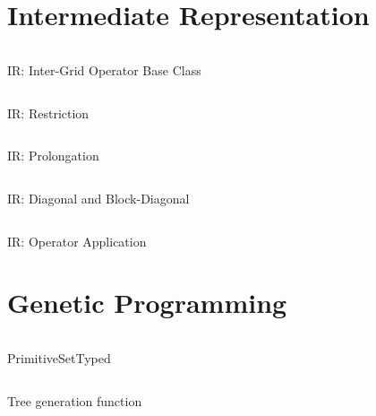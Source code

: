 \section{Intermediate Representation}
\label{appendix:ir}
\begin{listing}[!htb]
	\inputminted{python}{evostencils/ir/inter_grid_operator.py}
	\caption{IR: Inter-Grid Operator Base Class}
	\label{code:ir:inter-grid-operator}
\end{listing}
\begin{listing}[!htb]
	\inputminted{python}{evostencils/ir/restriction.py}
	\caption{IR: Restriction}
	\label{code:ir:restriction}
\end{listing}
\begin{listing}[!htb]
	\inputminted{python}{evostencils/ir/prolongation.py}
	\caption{IR: Prolongation}
	\label{code:ir:prolongation}
\end{listing}
\begin{listing}[!htb]
	\inputminted{python}{evostencils/ir/diagonal.py}
	\caption{IR: Diagonal and Block-Diagonal}
	\label{code:ir:diagonal}
\end{listing}
\begin{listing}[!htb]
	\inputminted{python}{evostencils/ir/multiplication.py}
	\caption{IR: Operator Application}
	\label{code:ir:multiplication}
\end{listing}
\clearpage
\section{Genetic Programming}
\label{appendix:gp}
\begin{listing}[!htb]
	\inputminted{python}{evostencils/gp/primitive_set_typed.py}
	\caption{PrimitiveSetTyped}
	\label{code:gp:primitive-set-typed}
\end{listing}
\begin{listing}[!htb]
	\inputminted{python}{evostencils/gp/generate.py}
	\caption{Tree generation function}
	\label{code:gp:generate}
\end{listing}
\clearpage
